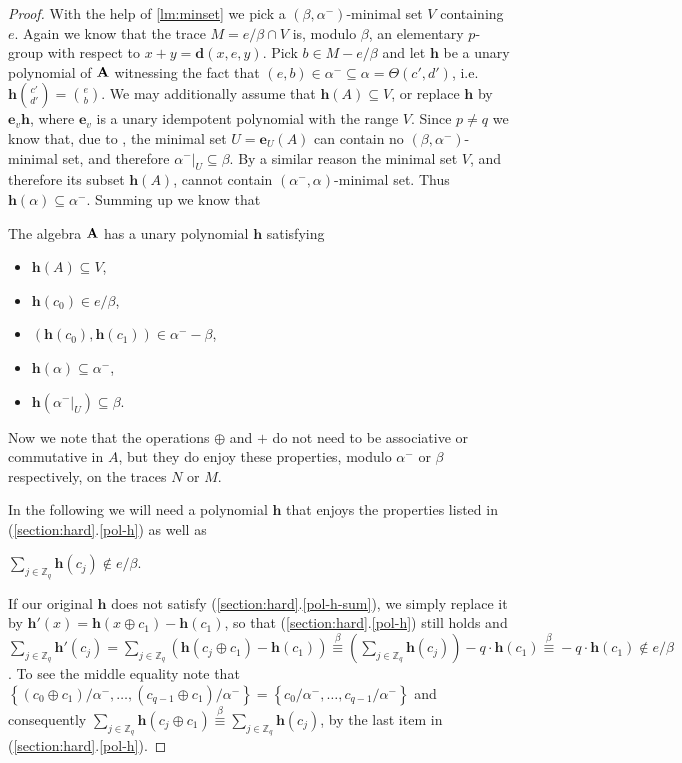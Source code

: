 \documentclass[11pt,a4paper]{amsart}
\newcounter{senumi}[section]
\newcounter{senumip}[section]
\newcounter{temp}[section]
\def\thesenumi{\thesection.\arabic{senumip}}
\newenvironment{senumerate}{\begin{list}{\hspace{-2em}(\thesenumi)}{\usecounter{senumip}}
\setcounter{senumip}{\value{temp}}
    }{\setcounter{temp}{\value{senumip}}
     \end{list}}
\newcommand{\m}[1]{{\uppercase {\bf{#1}}}}
\newcommand{\set}[1]{{\left\{ {#1} \right\} }}
\newcommand{\ci}{\subseteq}
\newcommand{\vpair}[2]{{{#1}\choose{#2}}}
\newcommand{\po}[1]{{\mathbf {#1}}}
\newcounter{note}
\newcommand{\congruent}[1]{\stackrel{#1}{\equiv}}
\newcommand{\setm}{-}
\newcommand{\alpham}{\alpha^-}
\newcommand{\z}{\mathbb{Z}}
\begin{document}
\begin{proof}
With the help of \cref{lm:minset} we pick a $(\beta,\alpham)$-minimal set $V$ containing $e$.
Again we know that the trace $M=e/\beta \cap V$ is, modulo $\beta$, an elementary $p$-group
with respect to $x+y = \po d(x,e,y)$.
Pick $b\in M\setm e/\beta$ and let $\po h$ be a unary polynomial of $\m A$ witnessing the fact that
$(e,b)\in \alpham \ci\alpha=\Theta(c',d')$, i.e. $\po h\vpair{c'}{d'} = \vpair{e}{b}$.
We may additionally assume that $\po h(A)\ci V$, or replace $\po h$ by $\po e_v\po h$, where $\po e_v$ is a unary idempotent polynomial with the range $V$.
Since $p\neq q$ we know that, due to \cite[Lemma 4.30]{hm},
the minimal set $U=\po e_U(A)$ can contain no $(\beta,\alpham)$-minimal set,
and therefore $\alpham|_U\ci\beta$.
By a similar reason the minimal set $V$, and therefore its subset $\po h(A)$,
cannot contain $(\alpham,\alpha)$-minimal set. Thus $\po h(\alpha)\ci\alpham$.
Summing up we know that
\begin{senumerate}
\item
\label{pol-h}
The algebra $\m A$ has a unary polynomial $\po h$ satisfying
\begin{itemize}
  \item $\po h(A)\ci V$,
  \item $\po h(c_0)\in e/\beta$,
  \item $(\po h(c_0),\po h(c_1))\in\alpham\setm\beta$,
  \item $\po h(\alpha)\ci \alpham$,
  \item $\po h(\alpham|_U)\ci \beta$.
\end{itemize}
\end{senumerate}
Now we note that the operations $\oplus$ and $+$ do not need to be associative or commutative in $A$, but they  do enjoy these properties, modulo $\alpham$ or $\beta$ respectively,
on the traces $N$ or $M$.

In the following we will need a polynomial $\po h$ that enjoys the properties listed in
(\ref{section:hard}.\ref{pol-h}) as well as
\begin{senumerate}
\item
\label{pol-h-sum}
$\sum_{j\in \z_q} \po h(c_j)\not\in e/\beta$.
\end{senumerate}
If our original $\po h$ does not satisfy (\ref{section:hard}.\ref{pol-h-sum}),
we simply replace it by
$\po h'(x)=\po h(x\oplus c_1)-\po h(c_1)$, so that
(\ref{section:hard}.\ref{pol-h}) still holds and
$\sum_{j\in \z_q}\po h'(c_j)=
\sum_{j\in \z_q}\left(\po h(c_j\oplus c_1)- \po h(c_1)\right) \congruent{\beta}
\left(\sum_{j\in \z_q}\po h(c_j)\right)-q\cdot\po h(c_1) \congruent{\beta}
-q\cdot\po h(c_1)\not\in e/\beta$.
To see the middle equality note that
$\set{(c_0\oplus c_1)/\alpham,\ldots,(c_{q-1}\oplus c_1)/\alpham}
=\set{c_0/\alpham,\ldots,c_{q-1}/\alpham}$
and consequently
$\sum_{j\in \z_q}\po h(c_j\oplus c_1)\congruent{\beta} \sum_{j\in \z_q}\po h(c_j)$,
by the last item in (\ref{section:hard}.\ref{pol-h}).


\end{proof}
\end{document}
